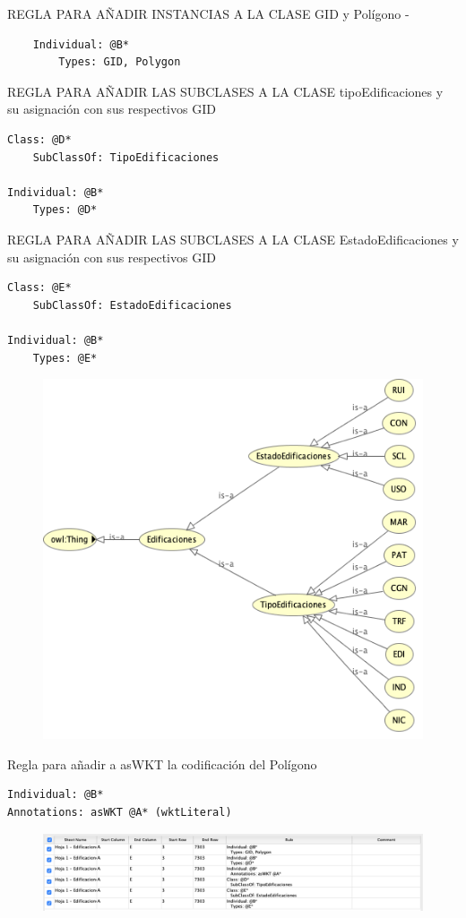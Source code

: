 REGLA PARA AÑADIR INSTANCIAS A LA CLASE GID y Polígono - 
\begin{lstlisting}
	Individual: @B*
		Types: GID, Polygon
\end{lstlisting}

REGLA PARA AÑADIR LAS SUBCLASES A LA CLASE tipoEdificaciones y su asignación con sus respectivos GID

\begin{lstlisting}
Class: @D*
	SubClassOf: TipoEdificaciones

Individual: @B*
	Types: @D*
\end{lstlisting}

REGLA PARA AÑADIR LAS SUBCLASES A LA CLASE EstadoEdificaciones y su asignación con sus respectivos GID


\begin{lstlisting}
Class: @E*
	SubClassOf: EstadoEdificaciones

Individual: @B*
	Types: @E*
\end{lstlisting}

\begin{figure}[H]
	\centering
	\includegraphics[width=0.7\linewidth]{imagenes/capitulo4/Edificaciones-copia}
	\caption{}
	\label{fig:edificaciones-copia}
\end{figure}


Regla para añadir a asWKT la codificación del Polígono

\begin{lstlisting}
Individual: @B*
Annotations: asWKT @A* (wktLiteral)
\end{lstlisting}

\begin{figure}[H]
	\centering
	\includegraphics[width=0.7\linewidth]{imagenes/capitulo4/reglas-edificaciones}
	\caption{}
	\label{fig:reglas-edificaciones}
\end{figure}

